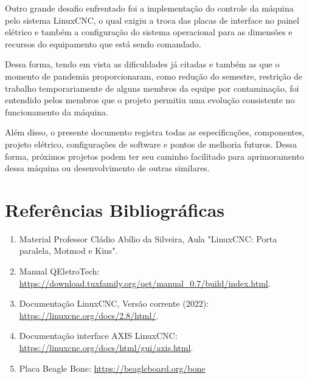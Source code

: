 \documentclass[
	article,			%
	11pt,				%
	oneside,			%
	a4paper,			%
	section=TITLE,		%
	english,			%
	brazil,				%
	sumario=tradicional
	]{abntex2}
\newcommand{\LCNC}{LinuxCNC}
\begin{document}
Outro grande desafio enfrentado foi a implementação do controle da máquina pelo sistema \LCNC, o qual exigiu a troca das placas de interface no painel elétrico e também a configuração do sistema operacional para as dimensões e recursos do equipamento que está sendo comandado.

Dessa forma, tendo em vista as dificuldades já citadas e também as que o momento de pandemia proporcionaram, como redução do semestre, restrição de trabalho temporariamente de alguns membros da equipe por contaminação, foi entendido pelos membros que o projeto permitiu uma evolução consistente no funcionamento da máquina.

Além disso, o presente documento registra todas as especificações, componentes, projeto elétrico, configurações de software e pontos de melhoria futuros. Dessa forma, próximos projetos podem ter seu caminho facilitado para aprimoramento dessa máquina ou desenvolvimento de outras similares.


\newpage
\section{Referências Bibliográficas}

\begin{enumerate}
    \small
    \item \label{bib:material-claudio} Material Professor Cládio Abílio da Silveira, Aula "\LCNC: Porta paralela, Motmod e Kins".
    \item \label{bib:manual-qeletrotech} Manual QEletroTech: \url{https://download.tuxfamily.org/qet/manual_0.7/build/index.html}.
    \item \label{bib:linuxcnc-doc} Documentação \LCNC, Versão corrente (2022): \url{https://linuxcnc.org/docs/2.8/html/}.
    \item \label{bib:linuxcnc-axis-doc} Documentação interface AXIS \LCNC: \url{https://linuxcnc.org/docs/html/gui/axis.html}.
    \item \label{bib:beaglebone} Placa Beagle Bone: \url{https://beagleboard.org/bone}
    
\end{enumerate}


\newpage
\end{document}
